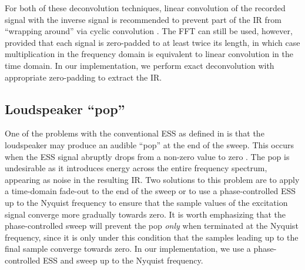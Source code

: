 For both of these deconvolution techniques, linear convolution of the recorded signal with the inverse signal is recommended to prevent part of the IR from ``wrapping around'' via cyclic convolution \citep{Farina2007a}.
The FFT can still be used, however, provided that each signal is zero-padded to at least twice its length, in which case multiplication in the frequency domain is equivalent to linear convolution in the time domain.
In our implementation, we perform exact deconvolution with appropriate zero-padding to extract the IR.

\subsection{Loudspeaker ``pop''}
One of the problems with the conventional ESS as defined in  is that the loudspeaker may produce an audible ``pop'' at the end of the sweep.
This occurs when the ESS signal abruptly drops from a non-zero value to zero \citep{Farina2007a}.
The pop is undesirable as it introduces energy across the entire frequency spectrum, appearing as noise in the resulting IR.
Two solutions to this problem are to apply a time-domain fade-out to the end of the sweep \citep{Farina2007a} or to use a phase-controlled ESS up to the Nyquist frequency \citep{VetterdiRosario2011} to ensure that the sample values of the excitation signal converge more gradually towards zero.
It is worth emphasizing that the phase-controlled sweep will prevent the pop \textit{only} when terminated at the Nyquist frequency, since it is only under this condition that the samples leading up to the final sample converge towards zero.
In our implementation, we use a phase-controlled ESS and sweep up to the Nyquist frequency.

